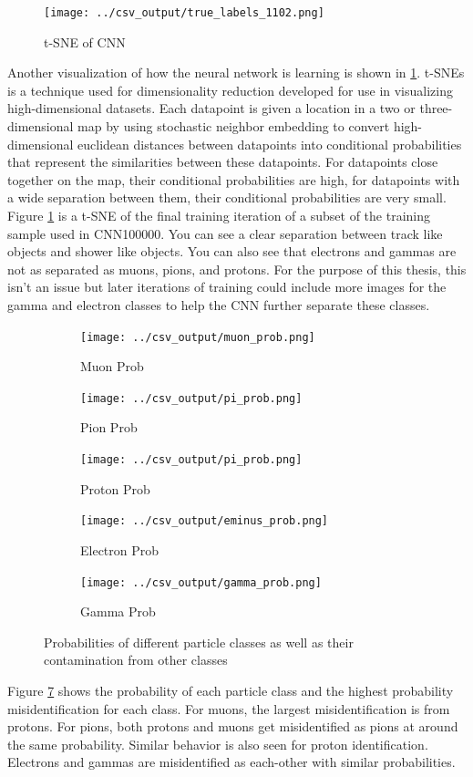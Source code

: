 \begin{figure}[htp!]
\centering
\texttt{[image: ../csv\_output/true\_labels\_1102.png]}
\caption{t-SNE of CNN}
\label{fig:tsne}
\end{figure}
Another visualization of how the neural network is learning is shown in \ref{fig:tsne}.  t-SNEs \cite{tsne} is a technique used for dimensionality reduction developed for use in visualizing high-dimensional datasets. Each datapoint is given a location in a two or three-dimensional map by using stochastic neighbor embedding to convert high-dimensional euclidean distances between datapoints into conditional probabilities that represent the similarities between these datapoints. For datapoints close together on the map, their conditional probabilities are high, for datapoints with a wide separation between them, their conditional probabilities are very small. Figure \ref{fig:tsne} is a t-SNE of the final training iteration of a subset of the training sample used in CNN100000. You can see a clear separation between track like objects and shower like objects. You can also see that electrons and gammas are not as separated as muons, pions, and protons. For the purpose of this thesis, this isn't an issue but later iterations of training could include more images for the gamma and electron classes to help the CNN further separate these classes.


\begin{figure}
\centering
	\begin{subfigure}[b]{.475\textwidth}
		\centering
		\texttt{[image: ../csv\_output/muon\_prob.png]}
		\caption{Muon Prob}
		\label{fig:muonprob}
	\end{subfigure}
	\begin{subfigure}[b]{.475\textwidth}
		\centering
		\texttt{[image: ../csv\_output/pi\_prob.png]}
		\caption{Pion Prob}
		\label{fig:piprob}
	\end{subfigure}
	\begin{subfigure}[b]{.475\textwidth}
		\centering
		\texttt{[image: ../csv\_output/pi\_prob.png]}
		\caption{Proton Prob}
	\label{fig:piprob}
	\end{subfigure}
	\begin{subfigure}[b]{.475\textwidth}
		\centering
		\texttt{[image: ../csv\_output/eminus\_prob.png]}
		\caption{Electron Prob}
		\label{fig:eminusprob}
	\end{subfigure}
	\begin{subfigure}[b]{.475\textwidth}
		\centering
		\texttt{[image: ../csv\_output/gamma\_prob.png]}
		\caption{Gamma Prob}
		\label{fig:gammaprob}
	\end{subfigure}
\caption{Probabilities of different particle classes as well as their contamination from other classes}
\label{fig:particleprob}
\end{figure}
Figure \ref{fig:particleprob} shows the probability of each particle class and the highest probability misidentification for each class. For muons, the largest misidentification is from protons. For pions, both protons and muons get misidentified as pions at around the same probability. Similar behavior is also seen for proton identification. Electrons and gammas are misidentified as each-other with similar probabilities.  



